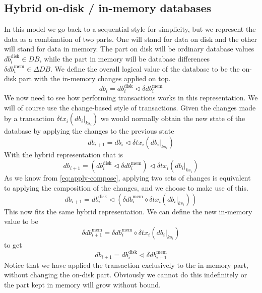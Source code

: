 \documentclass[11pt,a4paper]{article}
\newcommand\restrict[2]{\left.#1\right|_{#2}}
\begin{document}
\subsection{Hybrid on-disk / in-memory databases}

In this model we go back to a sequential style for simplicity, but we represent
the data as a combination of two parts. One will stand for data on disk and the
other will stand for data in memory. The part on disk will be ordinary database
values $\mathit{db}^{\mathrm{disk}}_i \in \mathit{DB}$, while the part in
memory will be database differences
$\delta\mathit{db}^{\mathrm{mem}}_i \in \Delta\mathit{DB}$. We
define the  overall logical value of the database to be the on-disk part with
the in-memory changes applied on top.
\[
\mathit{db}_i = \mathit{db}^{\mathrm{disk}}_i \triangleleft \delta\mathit{db}^{\mathrm{mem}}_i
\]
We now need to see how performing transactions works in this representation. We
will of course use the change-based style of transactions. Given the changes
made by a transaction $\delta\mathit{tx}_i(\restrict{\mathit{db}_i}{\mathit{ks}_i})$
we would normally obtain the new state of the database by applying the changes
to the previous state
\[
\mathit{db}_{i+1} = \mathit{db}_i \triangleleft \delta\mathit{tx}_i(\restrict{\mathit{db}_i}{\mathit{ks}_i})
\]
With the hybrid representation that is
\[
\mathit{db}_{i+1} = \left( \mathit{db}^{\mathrm{disk}}_i \triangleleft \delta\mathit{db}^{\mathrm{mem}}_i \right)
      \triangleleft \delta\mathit{tx}_i(\restrict{\mathit{db}_i}{\mathit{ks}_i})
\]
As we know from \cref{eq:apply-compose}, applying two sets of changes is
equivalent to applying the composition of the changes, and we choose to make
use of this.
\[
\mathit{db}_{i+1} = \mathit{db}^{\mathrm{disk}}_i
      \triangleleft \left( \delta\mathit{db}^{\mathrm{mem}}_i
                  \diamond \delta\mathit{tx}_i(\restrict{\mathit{db}_i}{\mathit{ks}_i})
                    \right)
\]
This now fits the same hybrid representation. We can define the new in-memory
value to be
\[
\delta\mathit{db}^{\mathrm{mem}}_{i+1} = \delta\mathit{db}^{\mathrm{mem}}_i
                  \diamond \delta\mathit{tx}_i(\restrict{\mathit{db}_i}{\mathit{ks}_i})
\]
to get
\[
\mathit{db}_{i+1} = \mathit{db}^{\mathrm{disk}}_i
      \triangleleft \delta\mathit{db}^{\mathrm{mem}}_{i+1}
\]
Notice that we have applied the transaction exclusively to the in-memory part,
without changing the on-disk part. Obviously we cannot do this indefinitely or
the part kept in memory will grow without bound.
\end{document}
